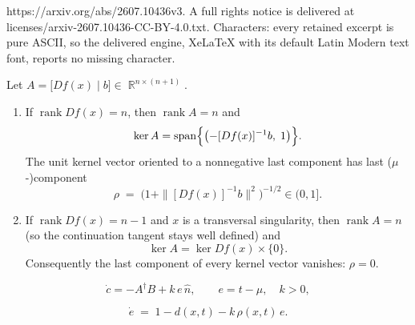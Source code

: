 \documentclass[10pt,a4paper]{amsart}
\DeclareMathOperator{\R}{\mathbb{R}}
\DeclareMathOperator{\rank}{\operatorname{rank}}
\DeclareMathOperator{\spanop}{span}
\begin{document}
https://arxiv.org/abs/2607.10436v3. A full rights notice is delivered at licenses/arxiv-2607.10436-CC-BY-4.0.txt. Characters: every retained excerpt is pure ASCII, so the delivered engine, XeLaTeX with its default Latin Modern text font, reports no missing character.
\begin{lemma}\label{lem:kernel}
Let $A = \bigl[ D f(x) \; \big| \; b \bigr] \in \R^{n\times(n+1)}$.
\begin{enumerate}
\item[(a)] If $\rank D f(x) = n$, then $\rank A = n$ and
\[
\ker A = \spanop\Bigl\{ \bigl( -[Df(x)]^{-1} b, \; 1 \bigr) \Bigr\}.
\]
The unit kernel vector oriented to a nonnegative last component has last ($\mu$-)component
\[
\rho \;=\; \bigl( 1 + \| [Df(x)]^{-1} b \|^2 \bigr)^{-1/2} \in (0,1].
\]
\item[(b)] If $\rank D f(x) = n-1$ and $x$ is a transversal singularity, then $\rank A = n$ (so the continuation tangent stays well defined) and
\[
\ker A = \ker D f(x) \times \{0\}.
\]
Consequently the last component of every kernel vector vanishes: $\rho = 0$.
\end{enumerate}
\end{lemma}

\begin{equation}\label{flow}
\dot c = -A^\dagger B + k\, e\, \hat n, \qquad e = t - \mu, \quad k > 0,
\end{equation}

\begin{equation}\label{error_ode}
\dot e \;=\; 1 - d(x,t) - k\, \rho(x,t)\, e .
\end{equation}
\end{document}
